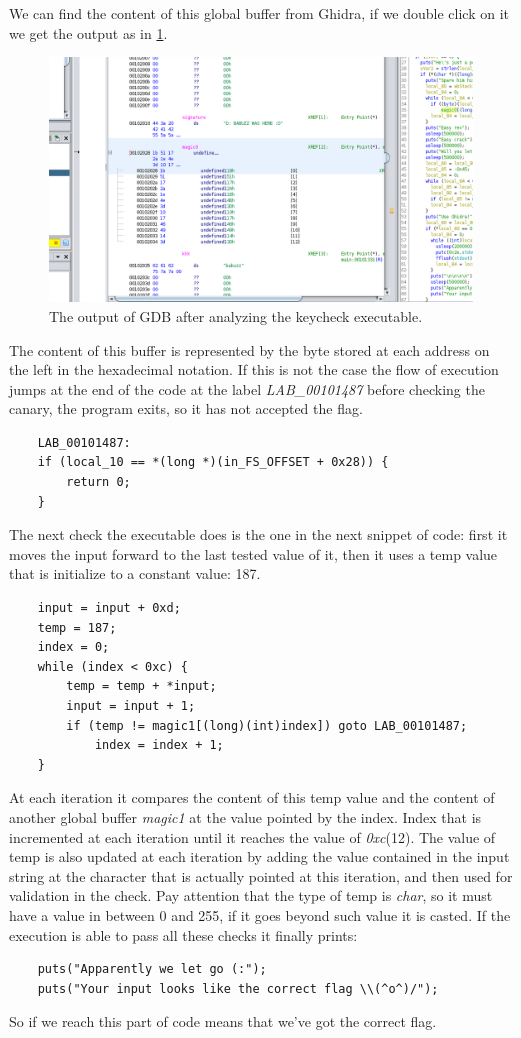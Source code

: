 \documentclass{article}
\begin{document}
We can find the content of this global buffer from Ghidra, if we double click on it we get the output as in \ref{fig:magic0}.
\begin{figure}[htp]
    \centering
    \includegraphics[width=1\textwidth]{images/ghidramagic0.png}
    \caption{The output of GDB after analyzing the keycheck executable.}
    \label{fig:magic0}
\end{figure}
The content of this buffer is represented by the byte stored at each address on the left in the hexadecimal notation.
If this is not the case the flow of execution jumps at the end of the code at the label \textit{LAB\_00101487} before checking the canary, the program exits, so it has not accepted the flag.
\begin{verbatim}
    LAB_00101487:
    if (local_10 == *(long *)(in_FS_OFFSET + 0x28)) {
        return 0;
    }
\end{verbatim}
The next check the executable does is the one in the next snippet of code: first it moves the input forward to the last tested value of it, then it uses a temp value that is initialize to a constant value: 187.
\begin{verbatim}
    input = input + 0xd;
    temp = 187;
    index = 0;
    while (index < 0xc) {
        temp = temp + *input;
        input = input + 1;
        if (temp != magic1[(long)(int)index]) goto LAB_00101487;
            index = index + 1;
    }
\end{verbatim}
At each iteration it compares the content of this temp value and the content of another global buffer \textit{magic1} at the value pointed by the index. Index that is incremented at each iteration until it reaches the value of \textit{0xc}(12).
The value of temp is also updated at each iteration by adding the value contained in the input string at the character that is actually pointed at this iteration, and then used for validation in the check.
Pay attention that the type of temp is \textit{char}, so it must have a value in between 0 and 255, if it goes beyond such value it is casted.
If the execution is able to pass all these checks it finally prints:
\begin{verbatim}
    puts("Apparently we let go (:");
    puts("Your input looks like the correct flag \\(^o^)/");
\end{verbatim}
So if we reach this part of code means that we've got the correct flag.
\end{document}
